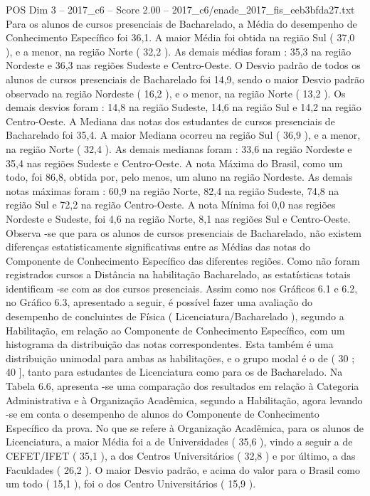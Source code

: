 \begin{textsample}{POS Dim 3 – 2017\_c6 – Score 2.00 – 2017\_c6/enade\_2017\_fis\_eeb3bfda27.txt}
Para os alunos de cursos presenciais de Bacharelado, a Média do desempenho de Conhecimento Específico foi 36,1.
A maior Média foi obtida na região Sul ( 37,0 ), e a menor, na região Norte ( 32,2 ).
As demais médias foram : 35,3 na região Nordeste e 36,3 nas regiões Sudeste e Centro-Oeste.
O Desvio padrão de todos os alunos de cursos presenciais de Bacharelado foi 14,9, sendo o maior Desvio padrão observado na região Nordeste ( 16,2 ), e o menor, na região Norte ( 13,2 ).
Os demais desvios foram : 14,8 na região Sudeste, 14,6 na região Sul e 14,2 na região Centro-Oeste.
A Mediana das notas dos estudantes de cursos presenciais de Bacharelado foi 35,4.
A maior Mediana ocorreu na região Sul ( 36,9 ), e a menor, na região Norte ( 32,4 ).
As demais medianas foram : 33,6 na região Nordeste e 35,4 nas regiões Sudeste e Centro-Oeste.
A nota Máxima do Brasil, como um todo, foi 86,8, obtida por, pelo menos, um aluno na região Nordeste.
As demais notas máximas foram : 60,9 na região Norte, 82,4 na região Sudeste, 74,8 na região Sul e 72,2 na região Centro-Oeste.
A nota Mínima foi 0,0 nas regiões Nordeste e Sudeste, foi 4,6 na região Norte, 8,1 nas regiões Sul e Centro-Oeste.
Observa -se que para os alunos de cursos presenciais de Bacharelado, não existem diferenças estatisticamente significativas entre as Médias das notas do Componente de Conhecimento Específico das diferentes regiões.
Como não foram registrados cursos a Distância na habilitação Bacharelado, as estatísticas totais identificam -se com as dos cursos presenciais.
Assim como nos Gráficos 6.1 e 6.2, no Gráfico 6.3, apresentado a seguir, é possível fazer uma avaliação do desempenho de concluintes de Física ( Licenciatura/Bacharelado ), segundo a Habilitação, em relação ao Componente de Conhecimento Específico, com um histograma da distribuição das notas correspondentes.
Esta também é uma distribuição unimodal para ambas as habilitações, e o grupo modal é o de ( 30 ; 40 ], tanto para estudantes de Licenciatura como para os de Bacharelado.
Na Tabela 6.6, apresenta -se uma comparação dos resultados em relação à Categoria Administrativa e à Organização Acadêmica, segundo a Habilitação, agora levando -se em conta o desempenho de alunos do Componente de Conhecimento Específico da prova.
No que se refere à Organização Acadêmica, para os alunos de Licenciatura, a maior Média foi a de Universidades ( 35,6 ), vindo a seguir a de CEFET/IFET ( 35,1 ), a dos Centros Universitários ( 32,8 ) e por último, a das Faculdades ( 26,2 ).
O maior Desvio padrão, e acima do valor para o Brasil como um todo ( 15,1 ), foi o dos Centro Universitários ( 15,9 ).

\end{textsample}
